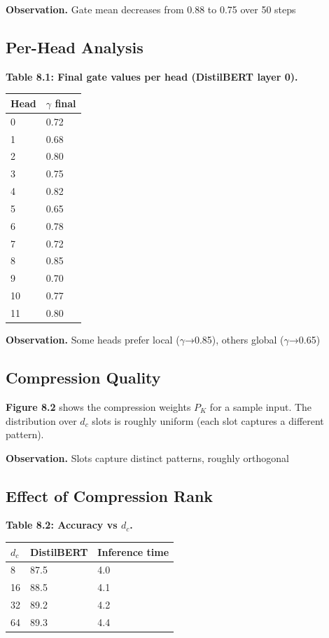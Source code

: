 \textbf{Observation.} Gate mean decreases from 0.88 to 0.75 over 50 steps

\subsection{Per-Head Analysis}

\textbf{Table 8.1: Final gate values per head (DistilBERT layer 0).}

\begin{table}[H]
\centering
\small
\begin{tabular}{ll}
\toprule
\textbf{Head} & \textbf{$\gamma$ final} \\
\midrule
0 & 0.72 \\
1 & 0.68 \\
2 & 0.80 \\
3 & 0.75 \\
4 & 0.82 \\
5 & 0.65 \\
6 & 0.78 \\
7 & 0.72 \\
8 & 0.85 \\
9 & 0.70 \\
10 & 0.77 \\
11 & 0.80 \\
\bottomrule
\end{tabular}
\end{table}

\textbf{Observation.} Some heads prefer local ($\gamma$→0.85), others global ($\gamma$→0.65)

\subsection{Compression Quality}

\textbf{Figure 8.2} shows the compression weights $P_K$ for a sample input. 
The distribution over $d_c$ slots is roughly uniform (each slot captures 
a different pattern).

\textbf{Observation.} Slots capture distinct patterns, roughly orthogonal

\subsection{Effect of Compression Rank}

\textbf{Table 8.2: Accuracy vs $d_c$.}

\begin{table}[H]
\centering
\small
\begin{tabular}{lll}
\toprule
\textbf{$d_c$} & \textbf{DistilBERT} & \textbf{Inference time} \\
\midrule
8 & 87.5 & 4.0 \\
16 & 88.5 & 4.1 \\
32 & 89.2 & 4.2 \\
64 & 89.3 & 4.4 \\
\bottomrule
\end{tabular}
\end{table}

